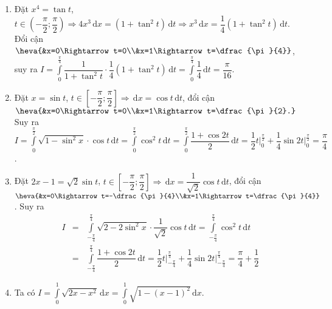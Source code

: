 \begin{ex}
{\begin{enumerate}
$I=\displaystyle\int\limits_{\tfrac{\pi}{6}}^{\tfrac{\pi}{3}}\dfrac{1}{3+3\tan^2t}\cdot\dfrac{\sqrt{3}}{2}\left(1+\tan^2t\right)\mathrm{\,d}t=\displaystyle\int\limits_{\tfrac{\pi}{6}}^{\tfrac{\pi}{3}}\dfrac{1}{2\sqrt{3}}\mathrm{\,d}t=\dfrac{\pi}{12\sqrt{3}}$.
\item Đặt $x^4=\tan t$, $t\in\left(-\dfrac{\pi}{2};\dfrac{\pi}{2}\right)\Rightarrow 4x^3\mathrm{\,d}x=\left(1+\tan^2t\right)\mathrm{\,d}t\Rightarrow x^3\mathrm{\,d}x=\dfrac{1}{4}\left(1+\tan^2t\right)\mathrm{\,d}t$.\\
Đổi cận $\heva{&x=0\Rightarrow t=0\\&x=1\Rightarrow t=\dfrac{\pi}{4}}$, suy ra
$I=\displaystyle\int\limits_0^{\tfrac{\pi}{4}}\dfrac{1}{1+\tan^2t}\cdot\dfrac{1}{4}\left(1+\tan^2t\right)\mathrm{\,d}t=\displaystyle\int\limits_0^{\tfrac{\pi}{4}}\dfrac{1}{4}\mathrm{\,d}t=\dfrac{\pi}{16}$.
\item Đặt $x=\sin t$, $t\in\left[-\dfrac{\pi}{2};\dfrac{\pi}{2}\right]\Rightarrow\mathrm{\,d}x=\cos t\mathrm{\,d}t$, đổi cận $\heva{&x=0\Rightarrow t=0\\&x=1\Rightarrow t=\dfrac{\pi}{2}.}$\\
Suy ra $I=\displaystyle\int\limits_0^{\tfrac{\pi}{2}}\sqrt{1-\sin^2x}\cdot \cos t\mathrm{\,d}t=\displaystyle\int\limits_0^{\tfrac{\pi}{2}} \cos^2t\mathrm{\,d}t=\displaystyle\int\limits_0^{\tfrac{\pi}{2}}\dfrac{1+\cos 2t}{2}\mathrm{\,d}t=\dfrac{1}{2}t\bigg|_0^{\tfrac{\pi}{2}}+\dfrac{1}{4}\sin 2t\bigg|_0^{\tfrac{\pi}{2}}=\dfrac{\pi}{4}$.
\item Đặt $2x-1=\sqrt{2}\sin t$, $t\in\left[-\dfrac{\pi}{2};\dfrac{\pi}{2}\right]\Rightarrow\mathrm{\,d}x=\dfrac{1}{\sqrt{2}}\cos t\mathrm{\,d}t$, đổi cận $\heva{&x=0\Rightarrow t=-\dfrac{\pi}{4}\\&x=1\Rightarrow t=\dfrac{\pi}{4}}$. Suy ra
\allowdisplaybreaks
\begin{eqnarray*}
	I & = & \displaystyle\int\limits_{-\tfrac{\pi}{4}}^{\tfrac{\pi}{4}}\sqrt{2-2\sin^2x}\cdot\dfrac{1}{\sqrt{2}}\cos t\mathrm{\,d}t=\displaystyle\int\limits_{-\tfrac{\pi}{4}}^{\tfrac{\pi}{4}} \cos^2t\mathrm{\,d}t\\
	& = & \displaystyle\int\limits_{-\tfrac{\pi}{4}}^{\tfrac{\pi}{4}}\dfrac{1+\cos 2t}{2}\mathrm{\,d}t=\dfrac{1}{2}t\bigg|_{-\tfrac{\pi}{4}}^{\tfrac{\pi}{4}}+\dfrac{1}{4}\sin 2t\bigg|_{-\tfrac{\pi}{4}}^{\tfrac{\pi}{4}}=\dfrac{\pi}{4}+\dfrac{1}{2}
\end{eqnarray*}
\item Ta có $I=\displaystyle\int\limits_0^1\sqrt{2x-x^2}\mathrm{\,d}x=\displaystyle\int\limits_0^1\sqrt{1-(x-1)^2}\mathrm{\,d}x$.\\

\end{enumerate}}
\end{ex}
